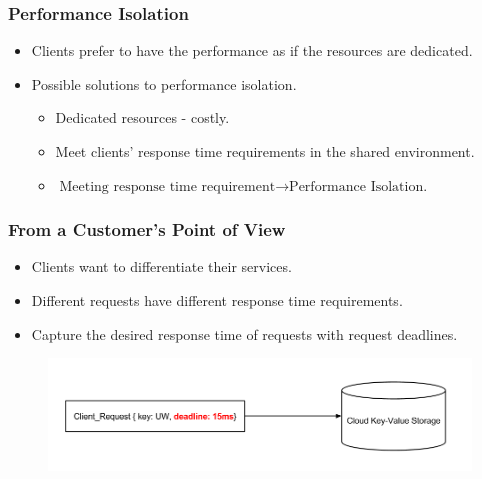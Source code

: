 \documentclass{beamer}
\newcommand{\myv}{\vspace{3 mm}}
\begin{document}
\begin{frame}
  \frametitle{Performance Isolation}
  \begin{itemize}
  \item Clients prefer to have the performance as if the resources are dedicated.
    \myv
  \item Possible solutions to performance isolation.
    \myv
    \begin{itemize}
    \item Dedicated resources - costly.
      \myv
    \item Meet clients' response time requirements in the shared environment.
      \myv
    \item \(\text{Meeting response time requirement} \rightarrow \text{Performance Isolation.}\)
    \end{itemize}
  \end{itemize}
\end{frame}


\begin{frame}
  \frametitle{From a Customer's Point of View}
  \myv
  \begin{itemize}
  \item Clients want to differentiate their services.
    \myv
  \item Different requests have different response time requirements.
    \myv
  \item Capture the desired response time of requests with request deadlines.
  \end{itemize}
  \vspace{-5 mm}
  \begin{figure}
    \includegraphics[scale=0.35]{img/Request_Deadline_Example.png}
  \end{figure}
\end{frame}
\end{document}
